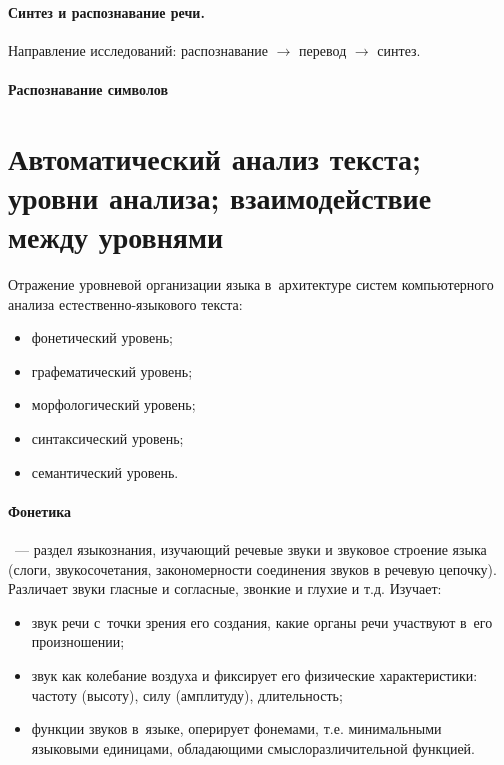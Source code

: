 \documentclass[12pt]{article}
\theoremstyle{definition}
\theoremstyle{remark}
\numberwithin{equation}{section}
\begin{document}
\paragraph{Синтез и распознавание речи.}
Направление исследований: распознавание $\rightarrow$ перевод
$\rightarrow$ синтез.
\paragraph{Распознавание символов}

\section{Автоматический анализ текста; уровни анализа; взаимодействие
между уровнями}
Отражение уровневой организации языка в~архитектуре систем
компьютерного анализа естественно-языкового текста:
\begin{itemize}
    \item фонетический уровень;
    \item графематический уровень;
    \item морфологический уровень;
    \item синтаксический уровень;
    \item семантический уровень.
\end{itemize}

\paragraph{Фонетика}~--- раздел языкознания, изучающий речевые
звуки и звуковое строение языка (слоги, звукосочетания, закономерности
соединения звуков в речевую цепочку). Различает звуки гласные
и согласные, звонкие и глухие и т.д. Изучает:
\begin{itemize}
    \item звук речи с~точки зрения его создания, какие органы речи
    участвуют в~его произношении;
    \item звук как колебание воздуха и фиксирует его физические
    характеристики: частоту (высоту), силу (амплитуду), длительность;
    \item функции звуков в~языке, оперирует фонемами, т.е.
    минимальными языковыми единицами, обладающими смыслоразличительной
    функцией.
\end{itemize}
\end{document}
